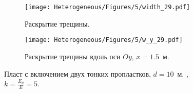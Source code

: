 \begin{figure}[htbp]
    \centering
    \begin{subfigure}[t]{0.4\textwidth}
        \centering
        \caption{Раскрытие трещины.}
        \texttt{[image: Heterogeneous/Figures/5/width\_29.pdf]}
    \end{subfigure}
    \hfill 
    \begin{subfigure}[t]{0.55\textwidth}
        \centering
        \caption{Раскрытие трещины вдоль оси $Oy$, $x=1.5$~м.}
        \texttt{[image: Heterogeneous/Figures/5/w\_y\_29.pdf]}
    \end{subfigure}
    \caption{Пласт с включением двух тонких пропластков, $d=10$~м. , $k=\frac{E_d}{E}=5$.}
    \label{fig:thin-layer-2}
\end{figure}